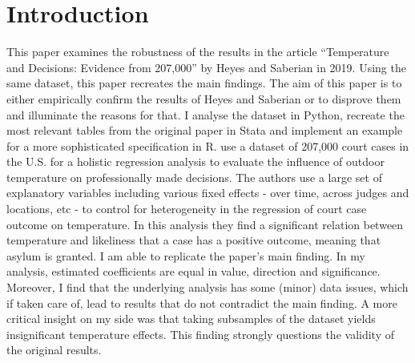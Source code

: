 \documentclass[11pt]{article}
\begin{document}
	\section{Introduction}
	This paper examines the robustness of the results in the article “Temperature and Decisions: Evidence from 207,000” by Heyes and Saberian in 2019. Using the same dataset, this paper recreates the main findings. The aim of this paper is to either empirically confirm the results of Heyes and Saberian or to disprove them and illuminate the reasons for that. I analyse the dataset in Python, recreate the most relevant tables from the original paper in Stata and implement an example for a more sophisticated specification in R.
	\newline \cite{Heyes.2019} use a dataset of 207,000 court cases in the U.S. for a holistic regression analysis to evaluate the influence of outdoor temperature on professionally made decisions. The authors use a large set of explanatory variables including various fixed effects - over time, across judges and locations, etc - to control for heterogeneity in the regression of court case outcome on temperature. In this analysis they find a significant relation between temperature and likeliness that a case has a positive outcome, meaning that asylum is granted.
	\newline I am able to replicate the paper’s main finding. In my analysis, estimated coefficients are equal in value, direction and significance. Moreover, I find that the underlying analysis has some (minor) data issues, which if taken care of, lead to results that do not contradict the main finding. A more critical insight on my side was that taking subsamples of the dataset yields insignificant temperature effects. This finding strongly questions the validity of the original results. 
\end{document}
